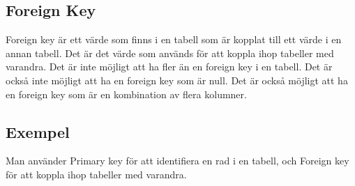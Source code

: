 \hypertarget{foreign-key}{%
\subsection{Foreign Key}\label{foreign-key}}

Foreign key är ett värde som finns i en tabell som är kopplat till ett
värde i en annan tabell. Det är det värde som används för att koppla
ihop tabeller med varandra. Det är inte möjligt att ha fler än en
foreign key i en tabell. Det är också inte möjligt att ha en foreign key
som är null. Det är också möjligt att ha en foreign key som är en
kombination av flera kolumner.

\hypertarget{exempel}{%
\subsection{Exempel}\label{exempel}}

\hypertarget{cb1}{}
\begin{Shaded}
\begin{Highlighting}[]
 
    \NormalTok{,}
\NormalTok{(}\NormalTok{) } \NormalTok{,}
\NormalTok{(}\NormalTok{),}
\NormalTok{(}\NormalTok{),}
\NormalTok{(}\NormalTok{),}
 
\NormalTok{);}
 
    \NormalTok{,}
  \NormalTok{,}
  \NormalTok{,}
 
 
\NormalTok{);}
\end{Highlighting}
\end{Shaded}

Man använder Primary key för att identifiera en rad i en tabell, och
Foreign key för att koppla ihop tabeller med varandra.

